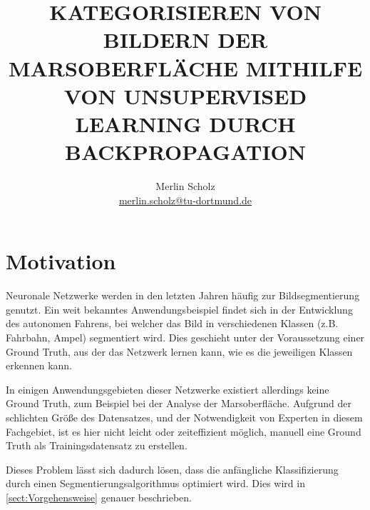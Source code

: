 \documentclass[a4paper,twocolumn,abstract,DIV=16]{scrartcl}
\title{\uppercase{Kategorisieren von Bildern der Marsoberfläche mithilfe von Unsupervised Learning durch Backpropagation}}
\author{Merlin Scholz\\\small\href{mailto:merlin.scholz@tu-dortmund.de}{merlin.scholz@tu-dortmund.de}}
\date{}
\begin{document}
%




\section{Motivation}

Neuronale Netzwerke werden in den letzten Jahren häufig zur Bildsegmentierung genutzt. Ein weit bekanntes Anwendungsbeispiel findet sich in der Entwicklung des autonomen Fahrens, bei welcher das Bild in verschiedenen Klassen (z.B. Fahrbahn, Ampel) segmentiert wird. Dies geschieht unter der Voraussetzung einer Ground Truth, aus der das Netzwerk lernen kann, wie es die jeweiligen Klassen erkennen kann.

In einigen Anwendungsgebieten dieser Netzwerke existiert allerdings keine Ground Truth, zum Beispiel bei der Analyse der Marsoberfläche. Aufgrund der schlichten Größe des Datensatzes, und der Notwendigkeit von Experten in diesem Fachgebiet, ist es hier nicht leicht oder zeiteffizient möglich, manuell eine Ground Truth als Trainingsdatensatz zu erstellen.

Dieses Problem lässt sich dadurch lösen, dass die anfängliche Klassifizierung durch einen Segmentierungsalgorithmus optimiert wird. Dies wird in \autoref{sect:Vorgehensweise} genauer beschrieben.
\end{document}
